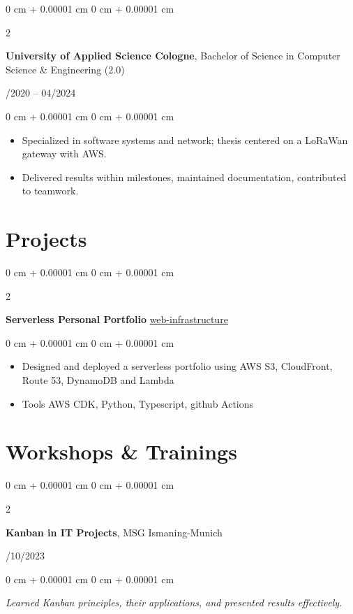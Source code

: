 \documentclass[10pt, letterpaper]{article}
\newenvironment{highlights}{
    \begin{itemize}[
        topsep=0.10 cm,
        parsep=0.10 cm,
        partopsep=0pt,
        itemsep=0pt,
        leftmargin=0 cm + 10pt
    ]
}{
    \end{itemize}
} %
\newenvironment{onecolentry}{
    \begin{adjustwidth}{
        0 cm + 0.00001 cm
    }{
        0 cm + 0.00001 cm
    }
}{
    \end{adjustwidth}
} %
\newenvironment{twocolentry}[2][]{
    \onecolentry
    \def\secondColumn{#2}
    \setcolumnwidth{\fill, 4.5 cm}
    \begin{paracol}{2}
}{
    \switchcolumn \raggedleft \secondColumn
    \end{paracol}
    \endonecolentry
} %
\begin{document}
\vspace{0.1cm}

\begin{twocolentry}{09/2020 -- 04/2024}
\textbf{University of Applied Science Cologne}, Bachelor of Science in Computer Science \& Engineering (2.0)
\end{twocolentry}
\begin{onecolentry}
\begin{highlights}
\item Specialized in software systems and network; thesis centered on a LoRaWan gateway with AWS.
\item Delivered results within milestones, maintained documentation, contributed to teamwork.
\end{highlights}
\end{onecolentry}



    \section{Projects}        
        \begin{twocolentry}{
           \href{https://github.com/aalhousseini/web-infrastructure}{web-infrastructure}
        }
            \textbf{Serverless Personal Portfolio}\end{twocolentry}
        \vspace{0.10 cm}
        \begin{onecolentry}
            \begin{highlights}
                \item Designed and deployed a serverless portfolio using AWS S3, CloudFront, Route 53, DynamoDB and Lambda
                \item Tools AWS CDK, Python, Typescript, github Actions
            \end{highlights}
        \end{onecolentry}

\vspace{0.2 cm}
        \vspace{0.2 cm}

     
    \section{Workshops \& Trainings}
\begin{twocolentry}{11/10/2023}
\textbf{Kanban in IT Projects}, MSG Ismaning-Munich
\end{twocolentry}
\begin{onecolentry}
\textit{Learned Kanban principles, their applications, and presented results effectively.}
\end{onecolentry}
\end{document}
